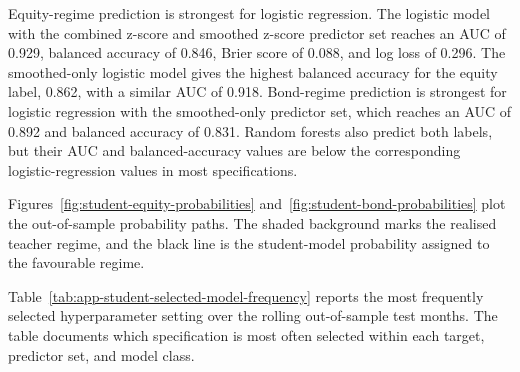 Equity-regime prediction is strongest for logistic regression. The logistic model with the combined z-score and smoothed z-score predictor set reaches an AUC of 0.929, balanced accuracy of 0.846, Brier score of 0.088, and log loss of 0.296. The smoothed-only logistic model gives the highest balanced accuracy for the equity label, 0.862, with a similar AUC of 0.918. Bond-regime prediction is strongest for logistic regression with the smoothed-only predictor set, which reaches an AUC of 0.892 and balanced accuracy of 0.831. Random forests also predict both labels, but their AUC and balanced-accuracy values are below the corresponding logistic-regression values in most specifications.

Figures~\ref{fig:student-equity-probabilities} and~\ref{fig:student-bond-probabilities} plot the out-of-sample probability paths. The shaded background marks the realised teacher regime, and the black line is the student-model probability assigned to the favourable regime.

Table~\ref{tab:app-student-selected-model-frequency} reports the most frequently selected hyperparameter setting over the rolling out-of-sample test months. The table documents which specification is most often selected within each target, predictor set, and model class.

